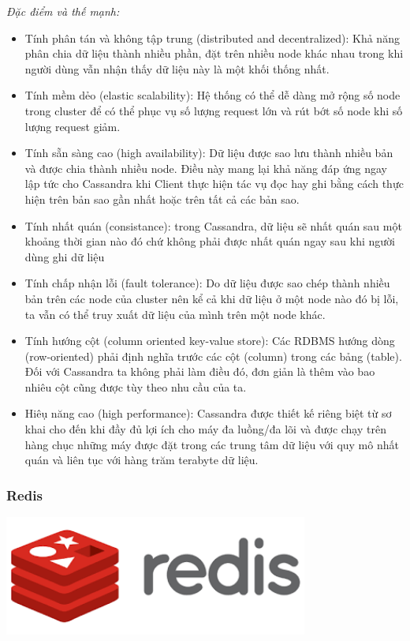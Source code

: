 \textit{Đặc điểm và thế mạnh:}
\begin{itemize}
    \item Tính phân tán và không tập trung (distributed and decentralized): Khả năng phân chia dữ liệu thành nhiều phần, đặt trên nhiều node khác nhau trong khi người dùng vẫn nhận thấy dữ liệu này là một khối thống nhất.
    \item Tính mềm dẻo (elastic scalability): Hệ thống có thể dễ dàng mở rộng số node trong cluster để có thể phục vụ số lượng request lớn và rút bớt số node khi số lượng request giảm.
    \item Tính sẵn sàng cao (high availability): Dữ liệu được sao lưu thành nhiều bản và được chia thành nhiều node. Điều này mang lại khả năng đáp ứng ngay lập tức cho Cassandra khi Client thực hiện tác vụ đọc hay ghi bằng cách thực hiện trên bản sao gần nhất hoặc trên tất cả các bản sao.
    \item Tính nhất quán (consistance): trong Cassandra, dữ liệu sẽ nhất quán sau một khoảng thời gian nào đó chứ không phải được nhất quán ngay sau khi người dùng ghi dữ liệu
    \item Tính chấp nhận lỗi (fault tolerance): Do dữ liệu được sao chép thành nhiều bản trên các node của cluster nên kể cả khi dữ liệu ở một node nào đó bị lỗi, ta vẫn có thể truy xuất dữ liệu của mình trên một node khác.
    \item Tính hướng cột (column oriented key-value store): Các RDBMS hướng dòng (row-oriented) phải định nghĩa trước các cột (column) trong các bảng (table). Đối với Cassandra ta không phải làm điều đó, đơn giản là thêm vào bao nhiêu cột cũng được tùy theo nhu cầu của ta.
    \item Hiêụ năng cao (high performance): Cassandra được thiết kế riêng biệt từ sơ khai cho đến khi đầy đủ lợi ích cho máy đa luồng/đa lõi và được chạy trên hàng chục những máy được đặt trong các trung tâm dữ liệu với quy mô nhất quán và liên tục với hàng trăm terabyte dữ liệu.
\end{itemize}
\subsubsection{Redis}
\begin{center}
  \captionsetup{type=figure}
  \includegraphics[width=10cm]{img/redis.png}
\end{center}


